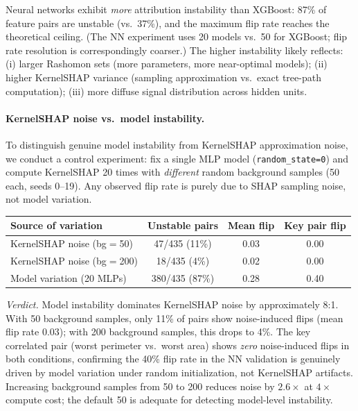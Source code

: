\documentclass{article}
\begin{document}
Neural networks exhibit \emph{more} attribution instability than XGBoost: 87\% of feature pairs are unstable (vs.\ 37\%), and the maximum flip rate reaches the theoretical ceiling. (The NN experiment uses 20 models vs.\ 50 for XGBoost; flip rate resolution is correspondingly coarser.) The higher instability likely reflects: (i) larger Rashomon sets (more parameters, more near-optimal models); (ii) higher KernelSHAP variance (sampling approximation vs.\ exact tree-path computation); (iii) more diffuse signal distribution across hidden units.

\paragraph{KernelSHAP noise vs.\ model instability.}
To distinguish genuine model instability from KernelSHAP approximation
noise, we conduct a control experiment: fix a single MLP model
(\texttt{random\_state=0}) and compute KernelSHAP 20 times with
\emph{different} random background samples (50 each, seeds 0--19).
Any observed flip rate is purely due to SHAP sampling noise, not
model variation.

\begin{center}
\small
\begin{tabular}{@{}lccc@{}}
\toprule
Source of variation & Unstable pairs & Mean flip & Key pair flip \\
\midrule
KernelSHAP noise (bg$=$50) & 47/435 (11\%) & 0.03 & 0.00 \\
KernelSHAP noise (bg$=$200) & 18/435 (4\%) & 0.02 & 0.00 \\
Model variation (20 MLPs) & 380/435 (87\%) & 0.28 & 0.40 \\
\bottomrule
\end{tabular}
\end{center}

\emph{Verdict.}
Model instability dominates KernelSHAP noise by approximately 8:1.
With 50 background samples, only 11\% of pairs show noise-induced
flips (mean flip rate 0.03); with 200 background samples, this drops
to 4\%. The key correlated pair (worst perimeter vs.\ worst area)
shows \emph{zero} noise-induced flips in both conditions, confirming
the 40\% flip rate in the NN validation is genuinely driven by model
variation under random initialization, not KernelSHAP artifacts.
Increasing background samples from 50 to 200 reduces noise by
$2.6\times$ at $4\times$ compute cost; the default 50 is adequate
for detecting model-level instability.
\end{document}
